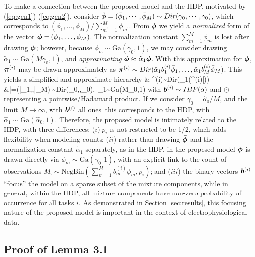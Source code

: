 \documentclass[journal]{IEEEtran}
\begin{document}
To make a connection between the proposed model and the HDP, motivated by (\ref{eq:gen1})-(\ref{eq:gen2}), consider $\bar{\boldsymbol{\phi}}=(\bar{\phi}_1,\cdots,\bar{\phi}_M) \sim \relax{Dir}(\gamma_0,\cdots,\gamma_0)$, which corresponds to $(\phi_1,\dots,\phi_M)/\sum_{m^\prime=1}^M \phi_{m^\prime}$. From $\bar{\boldsymbol{\phi}}$ we yield a \emph{normalized} form of the vector $\boldsymbol{\phi}=(\phi_1,\dots,\phi_M)$. The normalization constant $\sum_{m=1}^M\phi_m$ is lost after drawing $\bar{\boldsymbol{\phi}}$; however, because $\phi_m\sim\mbox{Ga}(\gamma_0,1)$, we may consider drawing $\tilde{\alpha}_1\sim\mbox{Ga}(M\gamma_0,1)$, and \emph{approximating} ${\boldsymbol{\phi}}\approx\tilde{\alpha}_1\bar{\boldsymbol{\phi}}$. With this approximation for $\boldsymbol{\phi}$, $\boldsymbol{\pi}^{(i)}$ may be drawn approximately as $\boldsymbol{\pi}^{(i)}\sim\relax{Dir}(\tilde{\alpha}_1b_1^{(i)}\bar{\phi}_1,\dots,\tilde{\alpha}_1b_M^{(i)}\bar{\phi}_M)$. This yields a simplified and approximate hierarchy
\beqs & \piv^{(i)}\sim\mbox{Dir}(\tilde{\alpha}_1(\bv^{(i)}\odot\bar{\phiv}))\\ &\bar{\phiv}=(\bar{\phi}_1,\cdots,\bar{\phi}_M) \sim \mbox{Dir}(\gamma_0,\cdots,\gamma_0),~\tilde{\alpha}_1\sim\mbox{Ga}(M\gamma_0,1)\nonumber\eeqs
with $\boldsymbol{b}^{(i)}\sim\relax{IBP}(\alpha)$ and $\odot$ representing a pointwise/Hadamard product. If we consider $\gamma_0=\hat{\alpha}_0/M$, and the limit $M\rightarrow\infty$, with $\boldsymbol{b}^{(i)}$ all ones, this corresponds to the HDP, with $\hat{\alpha}_1\sim\mbox{Ga}(\hat{\alpha}_0,1)$. Therefore, the proposed model is intimately related to the HDP, with three differences: ($i$) $p_i$ is not restricted to be 1/2, which adds flexibility when modeling counts; ($ii$) rather than drawing $\bar{\boldsymbol{\phi}}$ and the normalization constant $\tilde{\alpha}_1$ separately, as in the HDP, in the proposed model $\boldsymbol{\phi}$ is drawn directly via $\phi_m\sim\mbox{Ga}(\gamma_0,1)$, with an explicit link to the count of observations $M_i\sim\mbox{NegBin}(\sum_{m=1}^Mb_m^{(i)}\phi_m,p_i)$; and ($iii$) the binary vectors $\boldsymbol{b}^{(i)}$ ``focus'' the model on a sparse subset of the mixture components, while in general, within the HDP, all mixture components have non-zero probability of occurrence for all tasks $i$. As demonstrated in Section \ref{sec:results}, this focusing nature of the proposed model is important in the context of electrophysiological data.


\subsection{Proof of Lemma 3.1}
\end{document}
